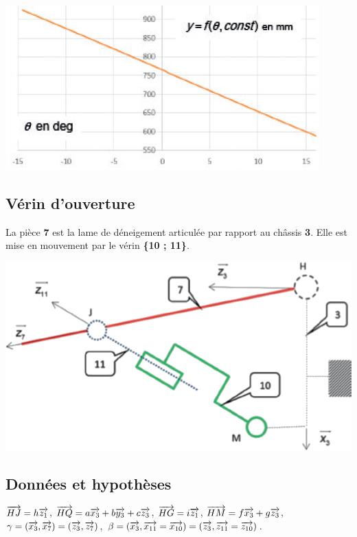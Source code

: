\documentclass[10pt,fleqn]{article} %
\begin{document}
\begin{multicols}{2}
\begin{center}
\includegraphics[width=\linewidth]{images/fig_06}
\end{center}

\subsection*{Vérin d'ouverture}
La pièce \textbf{7} est la lame de
déneigement articulée par
rapport au châssis \textbf{3}. Elle est
mise en mouvement par le
vérin \textbf{\{10 ; 11\}}.

\begin{center}
\includegraphics[width=\linewidth]{images/fig_07}
\end{center}


\subsection*{Données et hypothèses}
$\overrightarrow{HJ}=h\overrightarrow{z_1}$, $\overrightarrow{HQ}=a\overrightarrow{x_3}+b\overrightarrow{y_3}+c\overrightarrow{z_3}$, $\overrightarrow{HG}=i\overrightarrow{z_1}$, $\overrightarrow{HM}=f\overrightarrow{x_3}+g\overrightarrow{z_3}$, $\gamma = \left(\overrightarrow{x_3},\overrightarrow{x_7}\right)= \left(\overrightarrow{z_3},\overrightarrow{z_7}\right)$, $\beta=\left(\overrightarrow{x_3},\overrightarrow{x_{11}}=\overrightarrow{x_{10}}\right)=\left(\overrightarrow{z_3},\overrightarrow{z_{11}}=\overrightarrow{z_{10}}\right)$.


\end{multicols}
\end{document}

